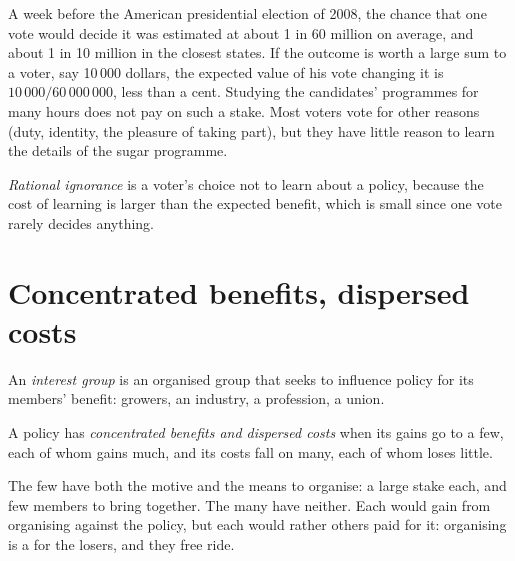 A week before the American presidential election of 2008, the chance that one vote would decide it was estimated at about 1 in 60 million on average, and about 1 in
10 million in the closest states. If the outcome is worth a large sum to a voter, say 10\,000 dollars, the expected value of his vote changing it is
$10\,000/60\,000\,000$, less than a cent. Studying the candidates' programmes for many hours does not pay on such a stake. Most voters vote for other reasons (duty,
identity, the pleasure of taking part), but they have little reason to learn the details of the sugar programme.

\begin{definition}\label{def:g11:public-choice-first-look:rational-ignorance}
\emph{Rational ignorance} is a voter's choice not to learn about a policy, because the cost of learning is larger than the expected benefit,
which is small since one vote rarely decides anything.
\end{definition}

\section{Concentrated benefits, dispersed costs}\label{sec:g11:public-choice-first-look:interest-groups}

\begin{definition}\label{def:g11:public-choice-first-look:interest-group}
An \emph{interest group} is an organised group that seeks to influence policy for its members' benefit: growers, an industry, a profession, a
union.
\end{definition}

\begin{definition}\label{def:g11:public-choice-first-look:concentrated-benefits}
A policy has \emph{concentrated benefits and dispersed costs} when its gains go to a few, each of whom gains much,
and its costs fall on many, each of whom loses little.
\end{definition}

The few have both the motive and the means to organise: a large stake each, and few members to bring together. The many have neither. Each would gain from
organising against the policy, but each would rather others paid for it: organising is a  for the losers, and they free ride.

